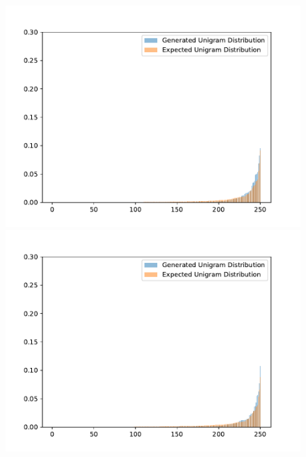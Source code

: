 \begin{figure}[H]
	\centering
	\small
	\endminipage\hfill
	\includegraphics[width=\linewidth]{img/plots/reddit/unigram_distribution_comparison_step_2000000.pdf}
	\centering
	\small
	\endminipage\hfill
	\includegraphics[width=\linewidth]{img/plots/reddit/unigram_distribution_comparison_step_2500000.pdf}
	\centering
	\small
	\endminipage\hfill

\end{figure}

